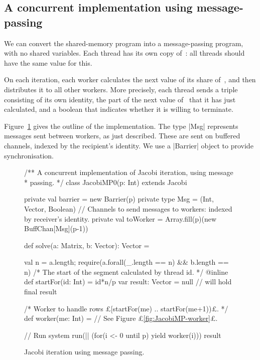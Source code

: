 
\subsection{A concurrent implementation using message-passing}

We can convert the shared-memory program into a message-passing program, with
no shared variables.  Each thread has its own copy of~: all threads
should have the same value for this.  

On each iteration, each worker calculates the next value of its share
of~, and then distributes it to all other workers.  More precisely,
each thread sends a triple consisting of its own identity, the part of the
next value of~ that it has just calculated, and a boolean that
indicates whether it is willing to terminate.  

Figure~\ref{fig:JacobiMP} gives the outline of the implementation.  The type
|Msg| represents messages sent between workers, as just described.  These are
sent on buffered channels, indexed by the recipient's identity.  We use a
|Barrier| object to provide synchronisation.


\begin{figure}
\begin{scala}
/** A concurrent implementation of Jacobi iteration, using message
  * passing. */
class JacobiMP0(p: Int) extends Jacobi{
  private val barrier = new Barrier(p)
  private type Msg = (Int, Vector, Boolean)
  // Channels to send messages to workers: indexed by receiver's identity.
  private val toWorker = Array.fill(p)(new BuffChan[Msg](p-1))

  def solve(a: Matrix, b: Vector): Vector = {
    val n = a.length; require(a.forall(_.length == n) && b.length == n)
    /* The start of the segment calculated by thread id. */
    @inline def startFor(id: Int) = id*n/p
    var result: Vector = null // will hold final result

    /* Worker to handle rows £[startFor(me) .. startFor(me+1))£. */
    def worker(me: Int) = // See Figure £\ref{fig:JacobiMP-worker}£.

    // Run system
    run(|| (for(i <- 0 until p) yield worker(i)))
    result
  }
}
\end{scala}
\caption{Jacobi iteration using message passing.}
\label{fig:JacobiMP}
\end{figure}

